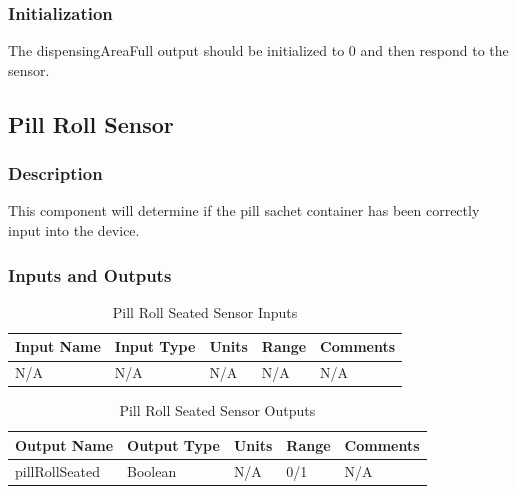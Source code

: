 \documentclass[12pt,titlepage]{article}
\begin{document}
\subsubsection*{Initialization}
The dispensingAreaFull output should be initialized to 0 and then respond to the sensor.
\subsection{Pill Roll Sensor}
\subsubsection*{Description}
This component will determine if the pill sachet container has been correctly input into the device.
\subsubsection*{Inputs and Outputs}

\begin{table}[ht!]
\begin{center}
\begin{adjustbox}{max width=\textwidth}
\small
\begin{tabular}{|p{}|p{}|p{}|p{}|p{}|}
 \hline
 \textbf{Input Name} & \textbf{Input Type} & \textbf{Units} &\textbf{Range} & \textbf{Comments} \\
 \hline 
 N/A & N/A  & N/A & N/A & N/A \\
 \hline
\end{tabular}
\end{adjustbox}
\end{center}
\caption{Pill Roll Seated Sensor Inputs}
\end{table}

\begin{table}[ht!]
\begin{center}
\begin{adjustbox}{max width=\textwidth}
\small
\begin{tabular}{|p{}|p{}|p{}|p{}|p{}|}
 \hline
 \textbf{Output Name} & \textbf{Output Type} & \textbf{Units} &\textbf{Range} & \textbf{Comments} \\
 \hline 
  pillRollSeated & Boolean & N/A & 0/1 & N/A \\
 \hline
\end{tabular}
\end{adjustbox}
\end{center}
\caption{Pill Roll Seated Sensor Outputs}
\end{table}
\end{document}
